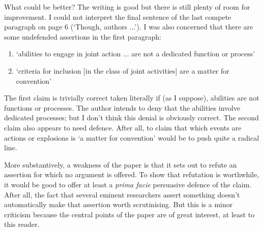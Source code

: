\documentclass[12pt,a4paper]{extarticle}
\begin{document}
What could be better?
The writing is good but there is still plenty of room for improvement.
I could not interpret the final sentence of the last compete paragraph on page 6 (‘Though, authors ...’).
I was also concerned that there are some undefended assertions in the first paragraph:
%
\begin{enumerate}
\item ‘abilities to engage in joint action ... are not a dedicated function or process’
\item ‘criteria for inclusion [in the class of joint activities] are a matter for convention’
\end{enumerate}
%
The first claim is trivially correct taken literally if (as I suppose), abilities are not functions or processes.
The author intends to deny that the abilities involve dedicated processes; but I don’t think this denial is obviously correct.
The second claim also appears to need defence.
After all, to claim that which events  are actions or explosions is ‘a matter for convention’ would be to push quite a radical line.

More substantively, a weakness of the paper is that it sets out to refute an assertion for which no argument is offered.
To show that refutation is worthwhile, it would be good to offer at least a \emph{prima facie} persuasive defence of the claim.
After all, the fact that several eminent researchers assert something doesn’t automatically make that assertion worth scrutinising.
But this is a minor criticism because the central points of the paper are of great interest, at least to this reader.







\small

\end{document}
